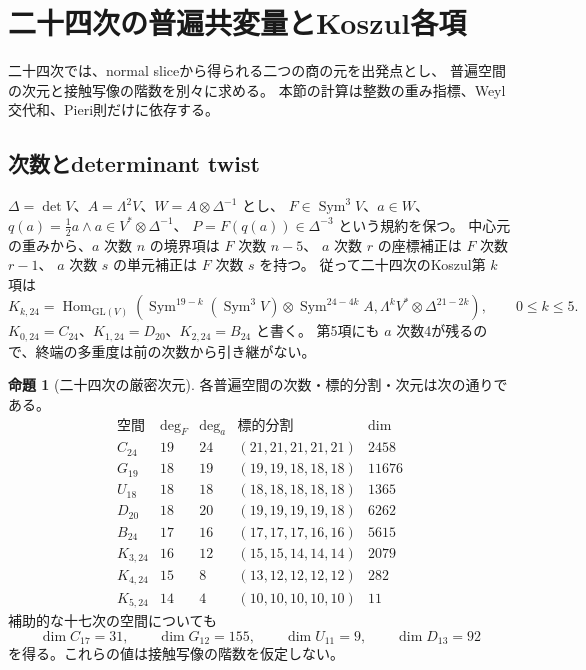 \documentclass[a4paper,11pt]{ltjsarticle}
\theoremstyle{definition}
\newtheorem{proposition}[theorem]{命題}
\begin{document}


\section{二十四次の普遍共変量とKoszul各項}
\label{sec:v17-characters}

二十四次では、normal sliceから得られる二つの商の元を出発点とし、
普遍空間の次元と接触写像の階数を別々に求める。
本節の計算は整数の重み指標、Weyl交代和、Pieri則だけに依存する。

\subsection{次数とdeterminant twist}

$\Delta=\det V$、$A=\Lambda^2V$、$W=A\otimes\Delta^{-1}$ とし、
$F\in\operatorname{Sym}^3V$、$a\in W$、
$q(a)=\tfrac12a\wedge a\in V^*\otimes\Delta^{-1}$、
$P=F(q(a))\in\Delta^{-3}$ という規約を保つ。
中心元の重みから、$a$ 次数 $n$ の境界項は $F$ 次数 $n-5$、
$a$ 次数 $r$ の座標補正は $F$ 次数 $r-1$、
$a$ 次数 $s$ の単元補正は $F$ 次数 $s$ を持つ。
従って二十四次のKoszul第 $k$ 項は
\[
 K_{k,24}=\operatorname{Hom}_{\mathrm{GL}(V)}
 \left(\operatorname{Sym}^{19-k}(\operatorname{Sym}^3V)
 \otimes\operatorname{Sym}^{24-4k}A,
 \Lambda^kV^*\otimes\Delta^{21-2k}\right),\qquad 0\leq k\leq5.
\]
$K_{0,24}=C_{24}$、$K_{1,24}=D_{20}$、$K_{2,24}=B_{24}$ と書く。
第5項にも $a$ 次数4が残るので、終端の多重度は前の次数から引き継がない。

\begin{proposition}[二十四次の厳密次元]
\label{prop:v17-character-dimensions}
各普遍空間の次数・標的分割・次元は次の通りである。
\[
\begin{array}{c|r|r|c|r}
\text{空間}&\deg_F&\deg_a&\text{標的分割}&\dim\\\hline
C_{24}&19&24&(21,21,21,21,21)&2458\\
G_{19}&18&19&(19,19,18,18,18)&11676\\
U_{18}&18&18&(18,18,18,18,18)&1365\\
D_{20}&18&20&(19,19,19,19,18)&6262\\
B_{24}&17&16&(17,17,17,16,16)&5615\\
K_{3,24}&16&12&(15,15,14,14,14)&2079\\
K_{4,24}&15&8&(13,12,12,12,12)&282\\
K_{5,24}&14&4&(10,10,10,10,10)&11
\end{array}
\]
補助的な十七次の空間についても
\[
 \dim C_{17}=31,\qquad \dim G_{12}=155,\qquad
 \dim U_{11}=9,\qquad \dim D_{13}=92
\]
を得る。これらの値は接触写像の階数を仮定しない。
\end{proposition}
\end{document}
